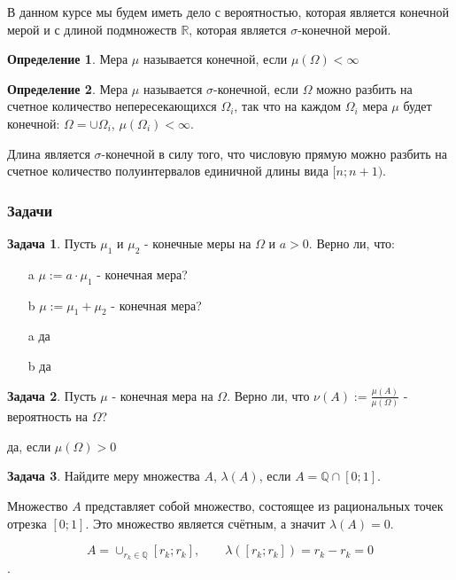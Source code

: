 \documentclass[pdftex, 12pt, a4paper]{article}
\def \mbb{\mathbb}
\def \Q{\mbb Q}
\def\R{\ensuremath{\mathbb{R}}} %
\def\s{\ensuremath{\sigma}}
\theoremstyle{definition} %
\newtheorem*{mydef}{Определение}
\newtheorem{problem}{Задача}
\numberwithin{problem}{section}
\numberwithin{blits}{section}
\begin{document}
В данном курсе мы будем иметь дело с вероятностью, которая является конечной мерой и с длиной подмножеств $\R$, которая является \s-конечной мерой.

\begin{mydef} Мера $\mu$ называется конечной, если $\mu(\Omega)<\infty$
\end{mydef}
\begin{mydef} Мера $\mu$ называется \s-конечной, если $\Omega$ можно разбить на счетное количество непересекающихся $\Omega_{i}$, так что на каждом $\Omega_{i}$ мера $\mu$ будет конечной: $\Omega=\cup \Omega_{i}$, $\mu(\Omega_{i})<\infty$.
\end{mydef}
Длина является \s-конечной в силу того, что числовую прямую можно разбить на счетное количество полуинтервалов единичной длины вида $[n;n+1)$.


\subsubsection*{Задачи}

\begin{problem}
Пусть $\mu_{1}$ и $\mu_{2}$ - конечные меры на $\Omega$ и $a>0$. Верно ли, что:
\begin{enumerate}
\item[a] $\mu:=a \cdot \mu_{1}$ - конечная мера? 
\item[b] $\mu:=\mu_{1}+\mu_{2}$ - конечная мера?
\end{enumerate}
\begin{sol}
\begin{enumerate}
\item[a] да
\item[b] да
\end{enumerate}
\end{sol}
\end{problem}



\begin{problem}
Пусть $\mu$ - конечная мера на $\Omega$. Верно ли, что $\nu(A):=\frac{\mu(A)}{\mu(\Omega)}$ - вероятность на $\Omega$?
\begin{sol}
да, если $\mu(\Omega)>0$
\end{sol}
\end{problem}


\begin{problem}
Найдите меру множества $A$, $\lambda(A)$, если $A = \Q \cap [0;1]$.
\begin{sol}
Множество $A$ представляет собой множество, состоящее из рациональных точек отрезка $[0;1]$. Это множество является счётным, а значит $\lambda(A) = 0$.

\[A = \cup_{r_k \in \Q} [r_k; r_k], \qquad \lambda([r_k;r_k]) = r_k - r_k =0\].
\end{sol}
\end{problem}
\end{document}

